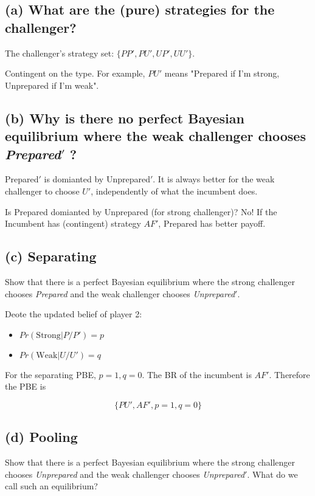 \documentclass{article}
\begin{document}
\medskip

\subsection*{(a) What are the (pure) strategies for the challenger?} 


The challenger's strategy set: $\{PP', PU', UP', UU'\}$.

\begin{mdframed}[backgroundcolor=blue!20,linecolor=white]
Contingent on the type. For example, $PU'$ means "Prepared if I'm strong, Unprepared if I'm weak".
\end{mdframed}

\subsection*{(b) Why is there no perfect Bayesian equilibrium where the weak challenger chooses
\textit{Prepared}$'$ ? }

Prepared$'$ is domianted by Unprepared$'$.
It is always better for the weak challenger to choose $U'$, independently of
what the incumbent does.

\begin{mdframed}[backgroundcolor=blue!20,linecolor=white]
Is {Prepared} domianted by {Unprepared} (for strong challenger)?
No! If the Incumbent has (contingent) strategy $AF'$, Prepared has better payoff.
\end{mdframed}

\subsection*{(c) Separating}Show that there is a perfect Bayesian equilibrium where the strong challenger chooses
\textit{Prepared} and the weak challenger chooses \textit{Unprepared}$'$. 

Deote the updated belief of player 2:
\begin{itemize}
\item $Pr(\text{Strong} | P/P') = p$
\item $Pr(\text{Weak} | U/U') = q$
\end{itemize}

For the separating PBE, $p=1,q=0$. The BR of the incumbent is
$AF'$. Therefore the PBE is

$$\{PU',AF',p=1,q=0\}$$


\subsection*{(d) Pooling}Show that there is a perfect Bayesian equilibrium where the strong challenger chooses
\textit{Unprepared} and the weak challenger chooses \textit{Unprepared}$'$. What do we call such an
equilibrium? 
\end{document}
